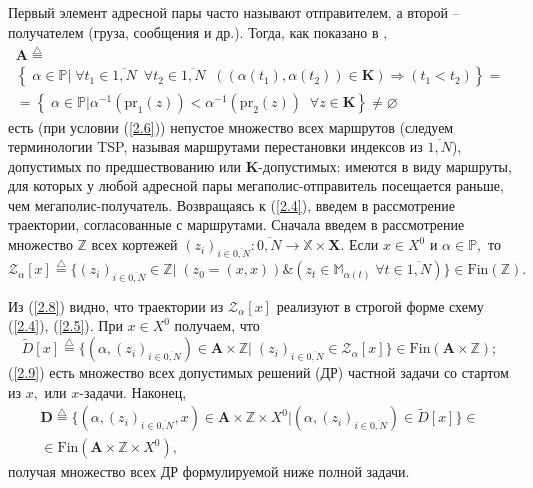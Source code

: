 \documentclass[10pt]{SPIIRAS_Proceedings}
\begin{document}
Первый элемент адресной пары часто называют отправителем,
а второй -- получателем
(груза, сообщения и др.).
Тогда, как показано в \cite[часть 2]{14},
\begin{multline}\label{2.7}
    \mathbf{A} \stackrel{\triangle}{=} \\
    \left\{\;\alpha \in \mathbb{P} \vert\;
      \forall{t_1} \in \overline{1,N}\;\
      \forall{t_2}  \in \overline{1,N}\;\;
      ((\alpha(t_1),\alpha(t_2)) \in \mathbf{K})
      \Longrightarrow (t_1 < t_2)
    \right\} = \\
    =
    \left\{\;
      \alpha \in \mathbb{P} \vert
      \alpha^{-1}(\mathrm{pr}_1(z)) < \alpha^{-1}(\mathrm{pr}_2(z))\;\;\forall{z}
      \in \mathbf{K}
    \right\} \ne \varnothing
\end{multline}
есть (при условии (\ref{2.6}))
непустое множество всех маршрутов
(следуем терминологии TSP,
называя маршрутами перестановки индексов из $\overline{1,N}$),
допустимых по предшествованию или $\mathbf{K}$-допустимых:
имеются в виду маршруты,
для которых у любой адресной пары мегаполис-отправитель посещается раньше,
чем мегаполис-получатель.
Возвращаясь к (\ref{2.4}),
введем в рассмотрение траектории,
согласованные с маршрутами.
Сначала введем в рассмотрение множество
$\mathbb{Z}$ всех кортежей
$(z_i)_{i \in \overline{0,N}}: \overline{0,N} \longrightarrow \mathbb{X} \times \mathbf{X}.$
Если $x \in X^0$ и $\alpha \in \mathbb{P},$
то
\begin{equation}\label{2.8}
\mathcal{Z}_\alpha[x] \stackrel{\triangle}{=} \{(z_i)_{i \in \overline{0,N}}
\in \mathbb{Z} \vert\;(z_0 = (x,x)) \& (z_t \in \mathbb{M}_{\alpha(t)}\;\forall{t} \in \overline{1,N})\} \in \mathrm{Fin}(\mathbb{Z}).
\end{equation}

Из (\ref{2.8}) видно,
что траектории из
$\mathcal{Z}_\alpha[x]$
реализуют в строгой форме схему (\ref{2.4}), (\ref{2.5}).
При $x \in X^0$
получаем, что
\begin{equation}\label{2.9}
  \tilde{D}[x] \stackrel{\triangle}{=}
  \{(\alpha,(z_i)_{i \in \overline{0,N}}) \in \mathbf{A} \times \mathbb{Z}
  \vert \;(z_i)_{i \in \overline{0,N}} \in \mathcal{Z}_\alpha[x]\}
  \in \mathrm{Fin}(\mathbf{A} \times \mathbb{Z});
\end{equation}
(\ref{2.9}) есть множество всех допустимых решений (ДР)
частной задачи со стартом из $x,$ или $x$-задачи.
Наконец,
\begin{multline}\label{2.10}
  \mathbf{D} \stackrel{\triangle}{=}
  \{(\alpha,(z_i)_{i \in \overline{0,N}},x) \in \mathbf{A} \times \mathbb{Z} \times X^0 \vert
  (\alpha,(z_i)_{i \in \overline{0,N}}) \in \tilde{D}[x]\}
  \in
  \\
  \in \mathrm{Fin}(\mathbf{A} \times \mathbb{Z} \times X^0),
\end{multline}
получая множество всех ДР формулируемой ниже полной задачи.
\end{document}
